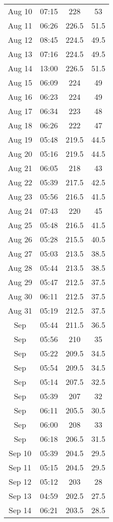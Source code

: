 \documentclass{article}
\begin{document}
\begin{longtable}{|c|c|c|c|}
Aug 10 & 07:15 & 228 & 53 \\
Aug 11 & 06:26 & 226.5 & 51.5 \\
Aug 12 & 08:45 & 224.5 & 49.5 \\
Aug 13 & 07:16 & 224.5 & 49.5 \\
Aug 14 & 13:00 & 226.5 & 51.5 \\
Aug 15 & 06:09 & 224 & 49 \\
Aug 16 & 06:23 & 224 & 49 \\
Aug 17 & 06:34 & 223 & 48 \\
Aug 18 & 06:26 & 222 & 47 \\
Aug 19 & 05:48 & 219.5 & 44.5 \\
Aug 20 & 05:16 & 219.5 & 44.5 \\
Aug 21 & 06:05 & 218 & 43\\
Aug 22 & 05:39 & 217.5 & 42.5\\
Aug 23 & 05:56 & 216.5 & 41.5 \\
Aug 24 & 07:43 & 220 & 45 \\
Aug 25 & 05:48 & 216.5 & 41.5 \\
Aug 26 & 05:28 & 215.5 & 40.5 \\
Aug 27 & 05:03 & 213.5 & 38.5 \\
Aug 28 & 05:44 & 213.5 & 38.5 \\
Aug 29 & 05:47 & 212.5 & 37.5 \\
Aug 30 & 06:11 & 212.5 & 37.5 \\
Aug 31 & 05:19 & 212.5 & 37.5 \\
\hline
Sep\:\: 1 & 05:44 & 211.5 & 36.5 \\
Sep\:\: 2 & 05:56 & 210 & 35 \\
Sep\:\: 3 & 05:22 & 209.5 & 34.5 \\
Sep\:\: 4 & 05:54 & 209.5 & 34.5 \\
Sep\:\: 5 & 05:14 & 207.5 & 32.5 \\
Sep\:\: 6 & 05:39 & 207 & 32 \\
Sep\:\: 7 & 06:11 & 205.5 & 30.5 \\
Sep\:\: 8 & 06:00 & 208 & 33 \\
Sep\:\: 9 & 06:18 & 206.5 & 31.5 \\
Sep 10 & 05:39 & 204.5 & 29.5 \\
Sep 11 & 05:15 & 204.5 & 29.5 \\
Sep 12 & 05:12 & 203 & 28 \\
Sep 13 & 04:59 & 202.5 & 27.5 \\
Sep 14 & 06:21 & 203.5 & 28.5 \\

\end{longtable}
\end{document}
